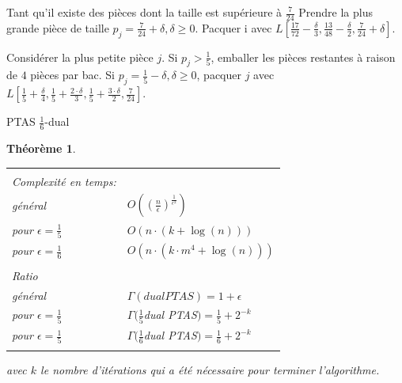 \documentclass[a4paper,12pt]{report}
\theoremstyle{plain}				%
\newtheorem{theoreme}{Théorème}	%
\theoremstyle{definition}				%
\begin{document}
\begin{algorithm}[H]
Tant qu'il existe des pièces dont la taille est supérieure à $\frac{7}{24}$
Prendre la plus grande pièce de taille $p_j = \frac{7}{24}+\delta, \delta \geq 0$.
Pacquer i avec
$L[\frac{17}{72}-\frac{\delta}{3},
   \frac{13}{48}-\frac{\delta}{2},
   \frac{7}{24}+\delta]$.

Considérer la plus petite pièce $j$.
Si $p_j>\frac{1}{5}$, emballer les pièces restantes à raison de $4$ pièces par bac.
Si $p_j=\frac{1}{5}-\delta, \delta \geq 0$, pacquer $j$ avec
$L[\frac{1}{5}+\frac{\delta}{4},
   \frac{1}{5}+\frac{2 \cdot \delta}{3},
   \frac{1}{5}+\frac{3 \cdot \delta}{2},
   \frac{7}{24}]$.

\BlankLine %



\caption{PTAS $\frac{1}{6}$-dual}
\label{algo:PTASDual1_6}
\end{algorithm}

\bigskip

\begin{theoreme}
\begin{flushleft}
\begin{tabular}{|p{8cm}p{6cm}|}
\hline
& \\
Complexité en temps:& \\
général&
	$ O(( \frac{n}{\epsilon})^\frac{1}{\epsilon ^ 2})$\\
pour $ \epsilon = \frac{1}{5}$ &
	$O(n \cdot (k + \log(n)))$ \\
pour $ \epsilon = \frac{1}{6}$ &
	$O(n \cdot (k \cdot m^4 + \log(n)))$

\\	%
& \\
Ratio & \\
général &
	$\Gamma(dual PTAS) = 1 + \epsilon$\\

pour $ \epsilon = \frac{1}{5}$ &
	$\Gamma(\frac{1}{5}$dual PTAS$) = \frac{1}{5} + 2^{-k}$\\

pour $ \epsilon = \frac{1}{5}$ &
	$\Gamma(\frac{1}{6}$dual PTAS$) = \frac{1}{6} + 2^{-k}$
\\
& \\
\hline
\end{tabular}
\end{flushleft}
avec $k$ le nombre d'itérations qui a été nécessaire pour terminer l'algorithme.
\end{theoreme}
\end{document}
